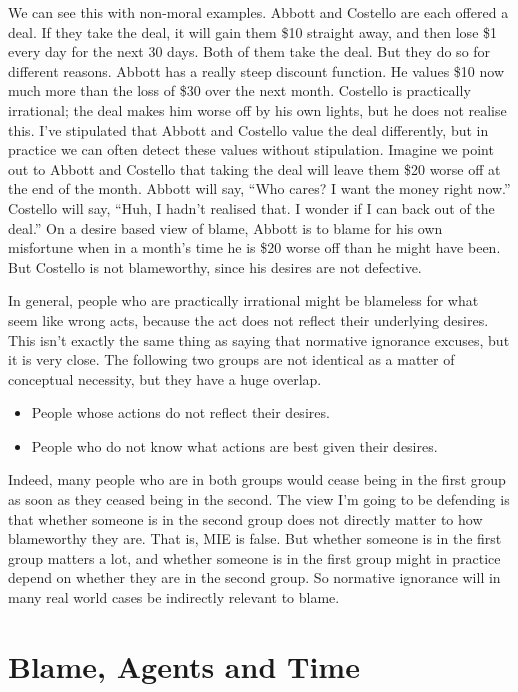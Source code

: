 \documentclass[
  10pt,
  letterpaper,
  twoside]{scrbook}
\providecommand{\tightlist}{%
  \setlength{\itemsep}{0pt}\setlength{\parskip}{0pt}}\usepackage{longtable,booktabs,array}
\begin{document}
We can see this with non-moral examples. {Abbott} and {Costello} are
each offered a deal. If they take the deal, it will gain them \$10
straight away, and then lose \$1 every day for the next 30 days. Both of
them take the deal. But they do so for different reasons. {Abbott} has a
really steep discount function. He values \$10 now much more than the
loss of \$30 over the next month. {Costello} is practically irrational;
the deal makes him worse off by his own lights, but he does not realise
this. I've stipulated that {Abbott} and {Costello} value the deal
differently, but in practice we can often detect these values without
stipulation. Imagine we point out to {Abbott} and {Costello} that taking
the deal will leave them \$20 worse off at the end of the month.
{Abbott} will say, ``Who cares? I want the money right now.'' {Costello}
will say, ``Huh, I hadn't realised that. I wonder if I can back out of
the deal.'' On a desire based view of blame, {Abbott} is to blame for
his own misfortune when in a month's time he is \$20 worse off than he
might have been. But {Costello} is not blameworthy, since his desires
are not defective.

In general, people who are practically irrational might be blameless for
what seem like wrong acts, because the act does not reflect their
underlying desires. This isn't exactly the same thing as saying that
normative ignorance excuses, but it is very close. The following two
groups are not identical as a matter of conceptual necessity, but they
have a huge overlap.

\begin{itemize}
\tightlist
\item
  People whose actions do not reflect their desires.
\item
  People who do not know what actions are best given their desires.
\end{itemize}

Indeed, many people who are in both groups would cease being in the
first group as soon as they ceased being in the second. The view I'm
going to be defending is that whether someone is in the second group
does not directly matter to how blameworthy they are. That is, MIE is
false. But whether someone is in the first group matters a lot, and
whether someone is in the first group might in practice depend on
whether they are in the second group. So normative ignorance will in
many real world cases be indirectly relevant to blame.

\section{Blame, Agents and Time}\label{blameagentsandtime}
\end{document}
